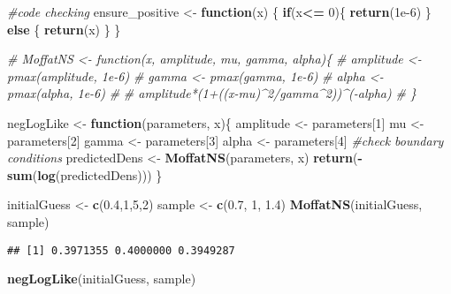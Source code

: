 \documentclass[
]{article}
\newenvironment{Shaded}{\begin{snugshade}}{\end{snugshade}}
\newcommand{\CommentTok}[1]{\textcolor[rgb]{0.56,0.35,0.01}{\textit{#1}}}
\newcommand{\ControlFlowTok}[1]{\textcolor[rgb]{0.13,0.29,0.53}{\textbf{#1}}}
\newcommand{\DecValTok}[1]{\textcolor[rgb]{0.00,0.00,0.81}{#1}}
\newcommand{\FloatTok}[1]{\textcolor[rgb]{0.00,0.00,0.81}{#1}}
\newcommand{\FunctionTok}[1]{\textcolor[rgb]{0.13,0.29,0.53}{\textbf{#1}}}
\newcommand{\NormalTok}[1]{#1}
\newcommand{\OtherTok}[1]{\textcolor[rgb]{0.56,0.35,0.01}{#1}}
\newcommand{\SpecialCharTok}[1]{\textcolor[rgb]{0.81,0.36,0.00}{\textbf{#1}}}
\begin{document}
\begin{Shaded}
\begin{Highlighting}[]
\CommentTok{\#code checking}
\NormalTok{ensure\_positive }\OtherTok{\textless{}{-}} \ControlFlowTok{function}\NormalTok{(x) \{}
  \ControlFlowTok{if}\NormalTok{(x}\SpecialCharTok{\textless{}=} \DecValTok{0}\NormalTok{)\{}
    \FunctionTok{return}\NormalTok{(}\FloatTok{1e{-}6}\NormalTok{)}
\NormalTok{  \} }\ControlFlowTok{else}\NormalTok{ \{}
    \FunctionTok{return}\NormalTok{(x)}
\NormalTok{  \}}
\NormalTok{\}}

\CommentTok{\# MoffatNS \textless{}{-} function(x, amplitude, mu, gamma, alpha)\{}
\CommentTok{\#   amplitude \textless{}{-} pmax(amplitude, 1e{-}6)}
\CommentTok{\#   gamma \textless{}{-} pmax(gamma, 1e{-}6)}
\CommentTok{\#   alpha \textless{}{-} pmax(alpha, 1e{-}6)}
\CommentTok{\# }
\CommentTok{\#   amplitude*(1+((x{-}mu)\^{}2/gamma\^{}2))\^{}({-}alpha)}
\CommentTok{\# \}}

\NormalTok{negLogLike }\OtherTok{\textless{}{-}} \ControlFlowTok{function}\NormalTok{(parameters, x)\{}
\NormalTok{  amplitude }\OtherTok{\textless{}{-}}\NormalTok{ parameters[}\DecValTok{1}\NormalTok{]}
\NormalTok{  mu }\OtherTok{\textless{}{-}}\NormalTok{ parameters[}\DecValTok{2}\NormalTok{]}
\NormalTok{  gamma }\OtherTok{\textless{}{-}}\NormalTok{ parameters[}\DecValTok{3}\NormalTok{]}
\NormalTok{  alpha }\OtherTok{\textless{}{-}}\NormalTok{ parameters[}\DecValTok{4}\NormalTok{]}
    \CommentTok{\#check boundary conditions}
\NormalTok{  predictedDens }\OtherTok{\textless{}{-}} \FunctionTok{MoffatNS}\NormalTok{(parameters, x)}
  \FunctionTok{return}\NormalTok{(}\SpecialCharTok{{-}}\FunctionTok{sum}\NormalTok{(}\FunctionTok{log}\NormalTok{(predictedDens)))}
\NormalTok{\}}

\NormalTok{initialGuess }\OtherTok{\textless{}{-}} \FunctionTok{c}\NormalTok{(}\FloatTok{0.4}\NormalTok{,}\DecValTok{1}\NormalTok{,}\DecValTok{5}\NormalTok{,}\DecValTok{2}\NormalTok{)}
\NormalTok{sample }\OtherTok{\textless{}{-}} \FunctionTok{c}\NormalTok{(}\FloatTok{0.7}\NormalTok{, }\DecValTok{1}\NormalTok{, }\FloatTok{1.4}\NormalTok{)}
\FunctionTok{MoffatNS}\NormalTok{(initialGuess, sample)}
\end{Highlighting}
\end{Shaded}

\begin{verbatim}
## [1] 0.3971355 0.4000000 0.3949287
\end{verbatim}

\begin{Shaded}
\begin{Highlighting}[]
\FunctionTok{negLogLike}\NormalTok{(initialGuess, sample)}
\end{Highlighting}
\end{Shaded}
\end{document}
